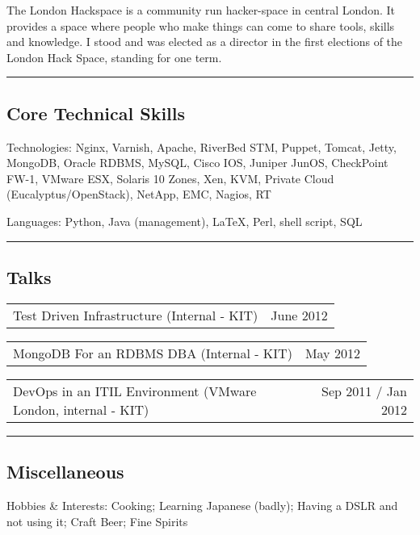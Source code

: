 \documentclass[10pt,a4paper]{article}
\makeatletter
\newenvironment{indentsection}[1]%
{\begin{list}{}%
	{\setlength{\leftmargin}{#1}}%
	\item[]%
}
{\end{list}}
\newcommand{\headerrow}[2]
{\begin{tabular*}{\linewidth}{l@{\extracolsep{\fill}}r}
	#1 &
	#2 \\
\end{tabular*}}
\makeatother
\begin{document}
\begin{itemize}
		The London Hackspace is a community run hacker-space in central London. It provides a space where people who make things can come to share tools, skills and knowledge. I stood and was elected as a director in the first elections of the London Hack Space, standing for one term.


\end{itemize}

\hrule
\vspace{-0.4em}
\subsection*{Core Technical Skills}

\begin{indentsection}{\parindent}
\begin{description*}
	\item[Technologies:]
	Nginx, Varnish, Apache, RiverBed STM, Puppet, Tomcat, Jetty, MongoDB, Oracle RDBMS, MySQL, Cisco IOS, Juniper JunOS, CheckPoint FW-1, VMware ESX, Solaris 10 Zones, Xen, KVM, Private Cloud (Eucalyptus/OpenStack), NetApp, EMC, Nagios, RT
	\item[Languages:]
	Python, Java (management), \LaTeX, Perl, shell script, SQL
\end{description*}
\end{indentsection}




\hrule
\vspace{-0.4em}
\subsection*{Talks}
    \headerrow
		{Test Driven Infrastructure (Internal - KIT)}
		{June 2012}
    \headerrow
		{MongoDB For an RDBMS DBA (Internal - KIT)}
		{May 2012}
    \headerrow
		{DevOps in an ITIL Environment (VMware London, internal - KIT)}
		{Sep 2011 / Jan 2012}

\hrule
\vspace{-0.4em}
\subsection*{Miscellaneous}

\begin{indentsection}{\parindent}
\begin{description*}
	\item[Hobbies \& Interests:]
	Cooking; Learning Japanese (badly); Having a DSLR and not using it; Craft Beer; Fine Spirits
\end{description*}
\end{indentsection}
\end{document}
